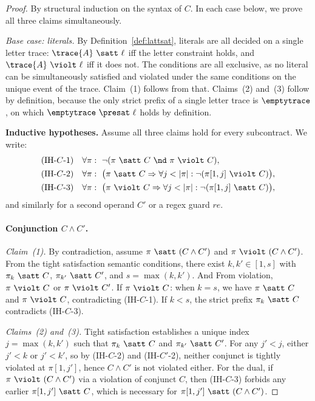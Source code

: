 \begin{proof}
By structural induction on the syntax of $C$. In each case below, we prove all three claims simultaneously.

\smallskip
\emph{Base case: literals.}
By Definition~\ref{def:lattsat}, literals are all decided on a single letter trace:
$\trace{A}\ \satt\ \ell$ iff the letter constraint holds, and
$\trace{A}\ \violt\ \ell$ iff it does not. The conditions are all exclusive, as no literal can be simultaneously satisfied and violated under the same conditions on the unique event of the trace. Claim~(1) follows from that.
Claims~(2) and~(3) follow by definition, because the only strict prefix of a single letter trace is $\emptytrace$, on which $\emptytrace\ \presat\ \ell$ holds by definition.

\medskip
\noindent\textbf{Inductive hypotheses.}
Assume all three claims hold for every subcontract. We write:
\[
\begin{aligned}
\text{(IH-$C$-1)}\quad
&\forall\pi:\  \neg(\pi\ \satt\ C\ \nd\ \pi\ \violt\ C),\\
\text{(IH-$C$-2)}\quad
&\forall\pi:\  \bigl(\pi\ \satt\ C \Rightarrow \forall j<|\pi|:\neg(\pi[1,j]\ \violt\ C)\bigr),\\
\text{(IH-$C$-3)}\quad
&\forall\pi:\  \bigl(\pi\ \violt\ C \Rightarrow \forall j<|\pi|:\neg(\pi[1,j]\ \satt\ C)\bigr),
\end{aligned}
\]
and similarly for a second operand $C'$ or a regex guard $re$.

\paragraph{Conjunction $C\wedge C'$.}
\emph{Claim~(1).}
By contradiction, assume $\pi\ \satt\ (C\wedge C')$ and $\pi\ \violt\ (C\wedge C')$.
From the tight satisfaction semantic conditions, there exist $k,k'\in[1,s]$ with $\pi_k\ \satt\ C$, $\pi_{k'}\ \satt\ C'$, and $s=\max(k,k')$. And From violation, $\pi\ \violt\ C$ or $\pi\ \violt\ C'$.
If $\pi\ \violt\ C$: when $k=s$, we have $\pi\ \satt\ C$ and $\pi\ \violt\ C$, contradicting (IH-$C$-1). If $k<s$, the strict prefix $\pi_k\ \satt\ C$ contradicts (IH-$C$-3).


\emph{Claims~(2) and~(3).}
Tight satisfaction establishes a unique index $j = \max(k,k')$ such that $\pi_k\ \satt\ C$ and $\pi_{k'}\ \satt\ C'$.
For any $j' < j$, either $j' < k$ or $j' < k'$, so by (IH-$C$-2) and (IH-$C'$-2), neither conjunct is tightly violated at $\pi[1,j']$, hence $C\wedge C'$ is not violated either.
For the dual, if $\pi\ \violt\ (C\wedge C')$ via a violation of conjunct $C$, then (IH-$C$-3) forbids any earlier $\pi[1,j']\ \satt\ C$, which is necessary for $\pi[1,j']\ \satt\ (C\wedge C')$.


\end{proof}

